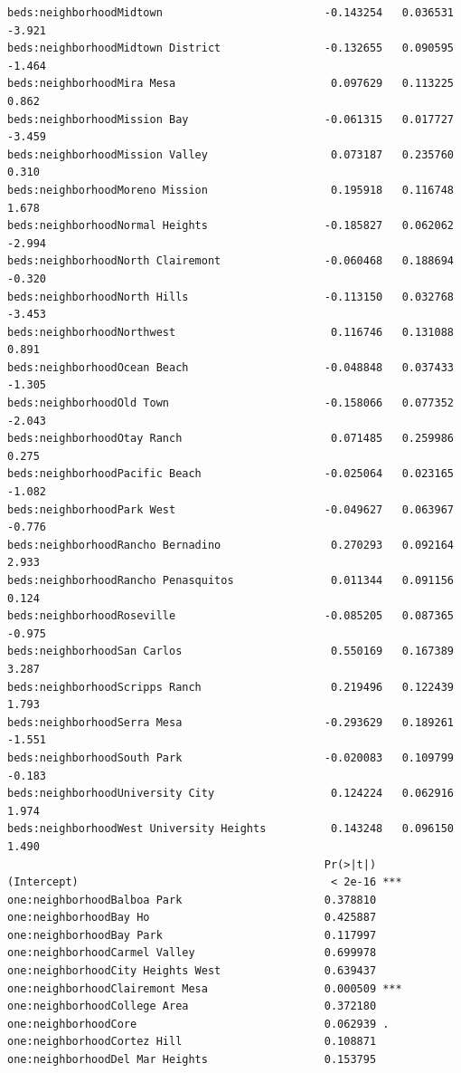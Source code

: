 \documentclass[
  letterpaper,
  DIV=11,
  numbers=noendperiod,
  oneside]{scrreprt}
\begin{document}
\begin{verbatim}
beds:neighborhoodMidtown                         -0.143254   0.036531  -3.921
beds:neighborhoodMidtown District                -0.132655   0.090595  -1.464
beds:neighborhoodMira Mesa                        0.097629   0.113225   0.862
beds:neighborhoodMission Bay                     -0.061315   0.017727  -3.459
beds:neighborhoodMission Valley                   0.073187   0.235760   0.310
beds:neighborhoodMoreno Mission                   0.195918   0.116748   1.678
beds:neighborhoodNormal Heights                  -0.185827   0.062062  -2.994
beds:neighborhoodNorth Clairemont                -0.060468   0.188694  -0.320
beds:neighborhoodNorth Hills                     -0.113150   0.032768  -3.453
beds:neighborhoodNorthwest                        0.116746   0.131088   0.891
beds:neighborhoodOcean Beach                     -0.048848   0.037433  -1.305
beds:neighborhoodOld Town                        -0.158066   0.077352  -2.043
beds:neighborhoodOtay Ranch                       0.071485   0.259986   0.275
beds:neighborhoodPacific Beach                   -0.025064   0.023165  -1.082
beds:neighborhoodPark West                       -0.049627   0.063967  -0.776
beds:neighborhoodRancho Bernadino                 0.270293   0.092164   2.933
beds:neighborhoodRancho Penasquitos               0.011344   0.091156   0.124
beds:neighborhoodRoseville                       -0.085205   0.087365  -0.975
beds:neighborhoodSan Carlos                       0.550169   0.167389   3.287
beds:neighborhoodScripps Ranch                    0.219496   0.122439   1.793
beds:neighborhoodSerra Mesa                      -0.293629   0.189261  -1.551
beds:neighborhoodSouth Park                      -0.020083   0.109799  -0.183
beds:neighborhoodUniversity City                  0.124224   0.062916   1.974
beds:neighborhoodWest University Heights          0.143248   0.096150   1.490
                                                 Pr(>|t|)    
(Intercept)                                       < 2e-16 ***
one:neighborhoodBalboa Park                      0.378810    
one:neighborhoodBay Ho                           0.425887    
one:neighborhoodBay Park                         0.117997    
one:neighborhoodCarmel Valley                    0.699978    
one:neighborhoodCity Heights West                0.639437    
one:neighborhoodClairemont Mesa                  0.000509 ***
one:neighborhoodCollege Area                     0.372180    
one:neighborhoodCore                             0.062939 .  
one:neighborhoodCortez Hill                      0.108871    
one:neighborhoodDel Mar Heights                  0.153795    

\end{verbatim}
\end{document}

